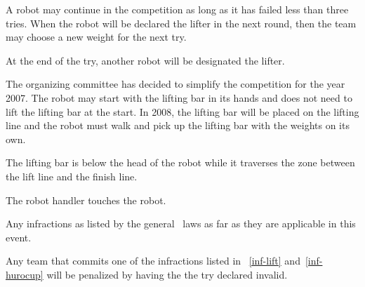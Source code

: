 \documentclass[12pt]{hurocup}
\begin{document}
\begin{lawlist}[WL]
\item A robot may continue in the competition as long as it has failed
 less than three tries. When the robot will be declared the lifter in
 the next round, then the team may choose a new weight for the next
 try. 

\item At the end of the try, another robot will be designated the
 lifter. 

\end{lawlist}

\begin{decisions}
\item The organizing committee has decided to simplify the competition
for the year 2007. The robot may start with the lifting bar in its
hands and does not need to lift the lifting bar at the start. In 2008,
the lifting bar will be placed on the lifting line and the robot must
walk and pick up the lifting bar with the weights on its own.
\end{decisions}


\begin{lawlist}[WL]
\item \label{inf-lift} The lifting bar is below the head of the robot
 while it traverses the zone between the lift line and the finish line.

\item \label{inf-handler} The robot handler touches the robot. 

\item \label{inf-hurocup} Any infractions as listed by the general
  \HuroCup\ laws as far as they are applicable in this event.

\item Any team that commits one of the infractions listed in
 ~\ref{inf-lift} and~\ref{inf-hurocup} will be penalized by having the
 the try declared invalid. 

\end{lawlist}

\end{document}
